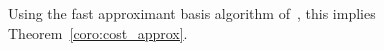 \documentclass[final,1p,times,authoryear]{elsarticle}
\newcommand{\NN}{\mathbb{N}} %
\newcommand{\field}{\mathbb{K}} %
\newcommand{\mat}[1]{\bm{\MakeUppercase{#1}}} %
\newcommand{\rdim}{m} %
\newcommand{\seqelt}[1]{\bm{F}_{#1}} %
\newcommand{\seq}{\mat{\mathcal{F}}} %
\newcommand{\seqL}{\mat{\mathcal{L}}} %
\newcommand{\degBd}{d} %
\newcommand{\degBdr}{d_{r}} %
\newcommand{\degBdl}{d_{\ell}} %
\newcommand{\trsp}[1]{#1^{\mathsf{T}}} %
\def\M {\ensuremath{\mathsf{M}}}
\def\K{\mathbb{K}}
\def\K {\ensuremath{\mathbb{K}}}
\newcommand{\mUt}{\trsp{\mU}}
\begin{document}


Using the fast approximant basis algorithm of~\citep{GiJeVi03}, this
implies Theorem~\ref{coro:cost_approx}.


\end{document}
